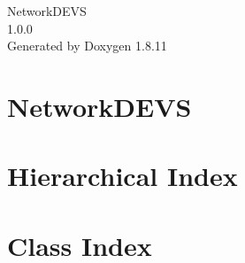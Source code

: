 \documentclass[twoside]{book}
\newcommand{\+}{\discretionary{\mbox{\scriptsize$\hookleftarrow$}}{}{}}
\newcommand{\clearemptydoublepage}{%
  \newpage{\pagestyle{empty}\cleardoublepage}%
}
\begin{document}
\hypersetup{pageanchor=false,
             bookmarksnumbered=true,
             pdfencoding=unicode
            }
\begin{titlepage}
\vspace*{7cm}
\begin{center}%
{\Large Network\+D\+E\+VS \\[1ex]\large 1.\+0.\+0 }\\
\vspace*{1cm}
{\large Generated by Doxygen 1.8.11}\\
\end{center}
\end{titlepage}
\clearemptydoublepage
\tableofcontents
\clearemptydoublepage
{}
\hypersetup{pageanchor=true}

\chapter{Network\+D\+E\+VS}
\label{md__home_lao_powerdevs_atomics_NetworkDEVS_README}
\hypertarget{md__home_lao_powerdevs_atomics_NetworkDEVS_README}{}

\chapter{Hierarchical Index}

\chapter{Class Index}

\end{document}
